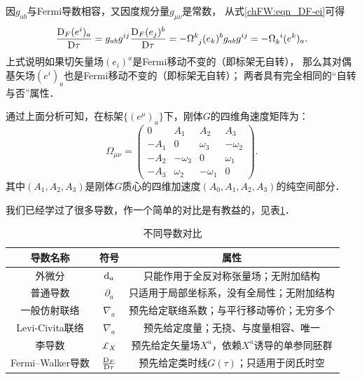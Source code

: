 因$g_{ab}$与Fermi导数相容，又因度规分量$g_{\mu\nu}$是常数，
从式\eqref{chFW:eqn_DF-ei}可得
\begin{equation}
	\frac{{\rm D}_F (e^i)_a}{{\rm D}\tau} = g_{ab}g^{ij}\frac{{\rm D}_F (e_j)^b}{{\rm D}\tau}
	= -\Omega^{k}_{\hphantom{k} j} (e_k)^b  g_{ab}g^{ij} =  -\Omega^{\hphantom{k} i}_{k} (e^k)_a .
\end{equation}
上式说明如果切矢量场$(e_i)^a$是Fermi移动不变的（即标架无自转），
那么其对偶基矢场$(e^i)_a$也是Fermi移动不变的（即标架无自转）；
两者具有完全相同的“自转与否”属性．

通过上面分析可知，在标架$\{(e^\mu)_a\}$下，刚体$G$的四维角速度矩阵为：
\begin{equation}\label{chFW:eqn_4DJSD}
	\Omega_{\mu\nu}=\begin{pmatrix}
		0 & A_1 & A_2 & A_3 \\
		-A_1 & 0 &  \omega_3 & -\omega_2 \\
		-A_2 & -\omega_3 & 0 & \omega_1 \\
		-A_3 & \omega_2 & -\omega_1 & 0
	\end{pmatrix}.
\end{equation}
其中$(A_1,A_2,A_3)$是刚体$G$质心的四维加速度$(A_0,A_1,A_2,A_3)$的纯空间部分．

我们已经学过了很多导数，作一个简单的对比是有教益的，见表\ref{chFW:tab-Derivative-all}．

\begin{table}[htb]
	\centering
	\caption{不同导数对比} \label{chFW:tab-Derivative-all}
	\begin{tabular}{|*3{c|}}
		\hline
		导数名称 & 符号 & 属性 \\ \hline
		外微分 & ${\rm d}_a$ & 只能作用于全反对称张量场；无附加结构 \\ \hline
		普通导数 & $\partial_a $ & 只适用于局部坐标系，没有全局性；无附加结构     \\ \hline
		一般仿射联络 & $\nabla_a$ & 预先给定联络系数；与平行移动等价；无穷多个 \\ \hline
		Levi-Civita联络 & $\nabla_a$ & 预先给定度量；无挠、与度量相容、唯一 \\ \hline
		李导数 & $\Lie_{X}$ & 预先给定矢量场$X^a$，依赖$X^a$诱导的单参同胚群 \\ \hline
		Fermi--Walker导数 & $\frac{{\rm D}_F }{{\rm D}\tau}$ &
		预先给定类时线$G(\tau)$；只适用于闵氏时空 \\ \hline
	\end{tabular}
\end{table}


